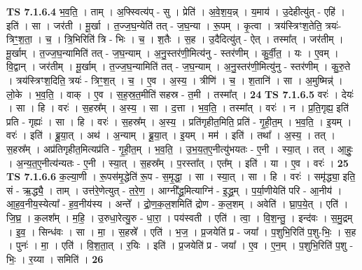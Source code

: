\documentclass[17pt]{extarticle}
\begin{document}
                  \newline
                                \textbf{ TS 7.1.6.4} \newline
                  भ॒व॒ति॒ । ताम् । अ॒फ्स्वित्य॑प् - सु । प्रेति॑ । अ॒वे॒श॒य॒न्न् । य॒माय॑ । उ॒देहीत्यु॑त् - एहि॑ । इति॑ । सा । जर॑ती । मू॒र्खा । त॒ज्ज॒घ॒न्येति॑ तत् - ज॒घ॒न्या । रू॒पम् । कृ॒त्वा । त्रय॑स्त्रिꣳश॒तेति॒ त्रयः॑-त्रिꣳ॒॒श॒ता॒ । च॒ । त्रि॒भिरिति॑ त्रि - भिः । च॒ । श॒तैः । स॒ह । उ॒दैदित्यु॑त् - ऐत् । तस्मा᳚त् । जर॑तीम् । मू॒र्खाम् । त॒ज्ज॒घ॒न्यामिति॑ तत् - ज॒घ॒न्याम् । अ॒नु॒स्तर॑णी॒मित्य॑नु - स्तर॑णीम् । कु॒र्वी॒त॒ । यः । ए॒वम् । वि॒द्वान् । जर॑तीम् । मू॒र्खाम् । त॒ज्ज॒घ॒न्यामिति॑ तत् - ज॒घ॒न्याम् । अ॒नु॒स्तर॑णी॒मित्यु॑नु - स्तर॑णीम् । कु॒रु॒ते । त्रय॑स्त्रिꣳश॒दिति॒ त्रयः॑ - त्रिꣳ॒॒श॒त् । च॒ । ए॒व । अ॒स्य॒ । त्रीणि॑ । च॒ । श॒तानि॑ । सा । अ॒मुष्मिन्न्॑ । लो॒के । भ॒व॒ति॒ । वाक् । ए॒व । स॒ह॒स्र॒त॒मीति॑ सहस्र - त॒मी । तस्मा᳚त् । \textbf{  24} \newline
                  \newline
                                \textbf{ TS 7.1.6.5} \newline
                  वरः॑ । देयः॑ । सा । हि । वरः॑ । स॒हस्र᳚म् । अ॒स्य॒ । सा । द॒त्ता । भ॒व॒ति॒ । तस्मा᳚त् । वरः॑ । न । प्र॒ति॒गृह्य॒ इति॑ प्रति - गृह्यः॑ । सा । हि । वरः॑ । स॒हस्र᳚म् । अ॒स्य॒ । प्रति॑गृहीत॒मिति॒ प्रति॑ - गृ॒ही॒त॒म् । भ॒व॒ति॒ । इ॒यम् । वरः॑ । इति॑ । ब्रू॒या॒त् । अथ॑ । अ॒न्याम् । ब्रू॒या॒त् । इ॒यम् । मम॑ । इति॑ । तथा᳚ । अ॒स्य॒ । तत् । स॒हस्र᳚म् । अप्र॑तिगृहीत॒मित्यप्र॑ति - गृ॒ही॒त॒म् । भ॒व॒ति॒ । उ॒भ॒य॒त॒ए॒नीत्यु॑भयतः - ए॒नी । स्या॒त् । तत् । आ॒हुः॒ । अ॒न्य॒त॒ए॒नीत्य॑न्यतः - ए॒नी । स्या॒त् । स॒हस्र᳚म् । प॒रस्ता᳚त् । एत᳚म् । इति॑ । या । ए॒व । वरः॑ । \textbf{  25} \newline
                  \newline
                                \textbf{ TS 7.1.6.6} \newline
                  क॒ल्या॒णी । रू॒पस॑मृ॒द्धेति॑ रू॒प - स॒मृ॒द्धा॒ । सा । स्या॒त् । सा । हि । वरः॑ । समृ॑द्ध्या॒ इति॒ सं - ऋ॒द्ध्यै॒ । ताम् । उत्त॑रे॒णेत्युत् - त॒रे॒ण॒ । आग्नी᳚द्ध्र॒मित्याग्नि॑ - इ॒द्ध्र॒म् । प॒र्या॒णीयेति॑ परि - आ॒नीय॑ । आ॒ह॒व॒नीय॒स्येत्या᳚ - ह॒व॒नीय॑स्य । अन्ते᳚ । द्रो॒ण॒क॒ल॒शमिति॑ द्रोण - क॒ल॒शम् । अवेति॑ । घ्रा॒प॒ये॒त् । एति॑ । जि॒घ्र॒ । क॒लश᳚म् । म॒हि॒ । उ॒रुधा॒रेत्यु॒रु - धा॒रा॒ । पय॑स्वती । एति॑ । त्वा॒ । वि॒श॒न्तु॒ । इन्द॑वः । स॒मु॒द्रम् । इ॒व॒ । सिन्ध॑वः । सा । मा॒ । स॒हस्रे᳚ । एति॑ । भ॒ज॒ । प्र॒जयेति॑ प्र - जया᳚ । प॒शुभि॒रिति॑ प॒शु-भिः॒ । स॒ह । पुनः॑ । मा॒ । एति॑ । वि॒श॒ता॒त् । र॒यिः । इति॑ । प्र॒जयेति॑ प्र - जया᳚ । ए॒व । ए॒न॒म् । प॒शुभि॒रिति॑ प॒शु - भिः॒ । र॒य्या । समिति॑ । \textbf{  26} \newline
\end{document}
